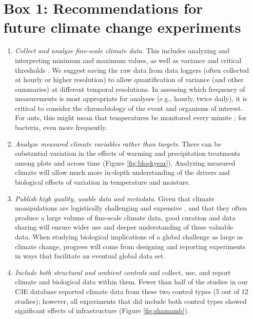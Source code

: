 \documentclass{article}
\begin{document}
\section* {Box 1: Recommendations for future climate change experiments} 
\begin{enumerate}
\item\textit{Collect and analyze fine-scale climate data.} This includes analyzing and interpreting minimum and maximum values, as well as variance and critical thresholds \citep[e.g., the number and duration of freeze-thaw events and accumulated chilling hours,][]{mcdaniel2014,vasseur2014}. We suggest saving the raw data from data loggers (often collected at hourly or higher resolution) to allow quantification of variance (and other summaries) at different temporal resolutions. In assessing which frequency of measurements is most appropriate for analyses (e.g., hourly, twice daily), it is critical to consider the chronobiology of the event and organisms of interest. For ants, this might mean that temperatures be monitored every minute \citep{shavit2017}; for bacteria, even more frequently. 
\item\textit{Analyze measured climate variables rather than targets}. There can be substantial variation in the effects of warming and precipitation treatments among plots and across time (Figure \ref{fig:blockyear}). Analyzing measured climate will allow much more in-depth understanding of the drivers and biological effects of variation in temperature and moisture.
\item\textit{Publish high quality, usable data and metadata}. Given that climate manipulations are logistically challenging and expensive \citep{aronson2009}, and that they often produce a large volume of fine-scale climate data, good curation and data sharing will ensure wider use and deeper understanding of these valuable data. When studying biological implications of a global challenge as large as climate change, progress will come from designing and reporting experiments in ways that facilitate an eventual global data set. %
\item\textit{Include both structural and ambient controls} and collect, use, and report climate and biological data within them. Fewer than half of the studies in our C3E database reported climate data from these two control types (5 out of 12 studies); however, all experiments that did include both control types showed significant effects of infrastructure (Figure \ref{fig:shamamb}). %

\end{enumerate}
\end{document}
